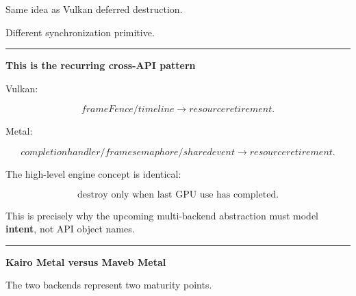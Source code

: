 Same idea as Vulkan deferred destruction.

Different synchronization primitive.

\begin{center}\rule{0.5\linewidth}{0.5pt}\end{center}

\textbf{This is the recurring cross-API pattern}

Vulkan:

\[
frameFence/timeline
\rightarrow
resource retirement.
\]

Metal:

\[
completion handler/frame semaphore/shared event
\rightarrow
resource retirement.
\]

The high-level engine concept is identical:

\[
\boxed{
\text{destroy only when last GPU use has completed}.
}
\]

This is precisely why the upcoming multi-backend abstraction must model \textbf{intent}, not API object names.

\begin{center}\rule{0.5\linewidth}{0.5pt}\end{center}

\textbf{Kairo Metal versus Maveb Metal}

The two backends represent two maturity points.

